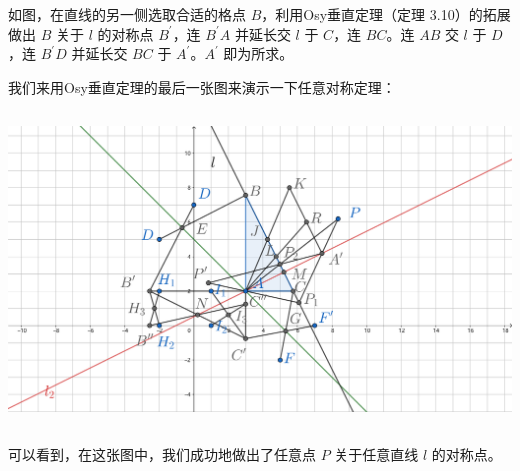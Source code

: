 \documentclass[UTF8]{article}
\begin{document}
如图，在直线的另一侧选取合适的格点 \(B\)，利用Osy垂直定理（定理
3.10）的拓展做出 \(B\) 关于 \(l\) 的对称点 \(B^{'}\)，连 \(B^{'}A\)
并延长交 \(l\) 于 \(C\)，连 \(BC\)。连 \(AB\) 交 \(l\) 于 \(D\)，连
\(B^{'}D\) 并延长交 \(BC\) 于 \(A^{'}\)。\(A^{'}\) 即为所求。

我们来用Osy垂直定理的最后一张图来演示一下任意对称定理：

\includegraphics[width=5.76806in,height=3.27847in]{media/image59.png}

可以看到，在这张图中，我们成功地做出了任意点 \(P\) 关于任意直线 \(l\)
的对称点。
\end{document}
